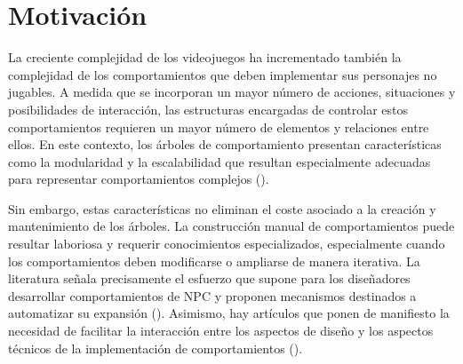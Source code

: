 \section{Motivación}
\label{sec:Motivacion}



La creciente complejidad de los videojuegos ha incrementado también la complejidad de los comportamientos que deben implementar sus personajes no jugables.
A medida que se incorporan un mayor número de acciones, situaciones y posibilidades de interacción, las estructuras encargadas de controlar estos comportamientos requieren un mayor número de elementos y relaciones entre ellos.
En este contexto, los árboles de comportamiento presentan características como la modularidad y la escalabilidad que resultan especialmente adecuadas para representar comportamientos complejos (\cite{DEFCON}).

Sin embargo, estas características no eliminan el coste asociado a la creación y mantenimiento de los árboles.
La construcción manual de comportamientos puede resultar laboriosa y requerir conocimientos especializados, especialmente cuando los comportamientos deben modificarse o ampliarse de manera iterativa.
La literatura señala precisamente el esfuerzo que supone para los diseñadores desarrollar comportamientos de NPC y proponen mecanismos destinados a automatizar su expansión (\cite{CBR}).
Asimismo, hay artículos que ponen de manifiesto la necesidad de facilitar la interacción entre los aspectos de diseño y los aspectos técnicos de la implementación de comportamientos (\cite{BTValRef}).

